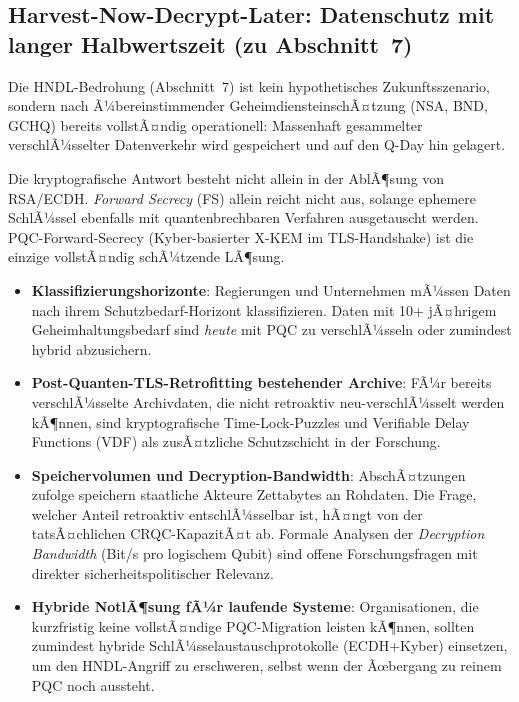 ﻿\documentclass[a4paper,12pt]{article}
\theoremstyle{definition}
\begin{document}
\subsection{Harvest-Now-Decrypt-Later: Datenschutz mit langer Halbwertszeit (zu Abschnitt~7)}

Die HNDL-Bedrohung (Abschnitt~7) ist kein hypothetisches
Zukunftsszenario, sondern nach Ã¼bereinstimmender
GeheimdiensteinschÃ¤tzung (NSA, BND, GCHQ) bereits vollstÃ¤ndig
operationell: Massenhaft gesammelter verschlÃ¼sselter Datenverkehr
wird gespeichert und auf den Q-Day hin gelagert.

Die kryptografische Antwort besteht nicht allein in der AblÃ¶sung
von RSA/ECDH. \emph{Forward Secrecy} (FS) allein reicht nicht aus,
solange ephemere SchlÃ¼ssel ebenfalls mit quantenbrechbaren Verfahren
ausgetauscht werden. PQC-Forward-Secrecy (Kyber-basierter X-KEM im
TLS-Handshake) ist die einzige vollstÃ¤ndig schÃ¼tzende LÃ¶sung.

\begin{itemize}
  \item \textbf{Klassifizierungshorizonte}: Regierungen und Unternehmen
    mÃ¼ssen Daten nach ihrem Schutzbedarf-Horizont klassifizieren.
    Daten mit 10+ jÃ¤hrigem Geheimhaltungsbedarf sind \emph{heute}
    mit PQC zu verschlÃ¼sseln oder zumindest hybrid abzusichern.
  \item \textbf{Post-Quanten-TLS-Retrofitting bestehender Archive}:
    FÃ¼r bereits verschlÃ¼sselte Archivdaten, die nicht retroaktiv
    neu-verschlÃ¼sselt werden kÃ¶nnen, sind kryptografische
    Time-Lock-Puzzles und Verifiable Delay Functions (VDF) als
    zusÃ¤tzliche Schutzschicht in der Forschung.
  \item \textbf{Speichervolumen und Decryption-Bandwidth}:
    AbschÃ¤tzungen zufolge speichern staatliche Akteure Zettabytes
    an Rohdaten. Die Frage, welcher Anteil retroaktiv entschlÃ¼sselbar
    ist, hÃ¤ngt von der tatsÃ¤chlichen CRQC-KapazitÃ¤t ab. Formale
    Analysen der \emph{Decryption Bandwidth} (Bit/s pro logischem Qubit)
    sind offene Forschungsfragen mit direkter sicherheitspolitischer
    Relevanz.
  \item \textbf{Hybride NotlÃ¶sung fÃ¼r laufende Systeme}:
    Organisationen, die kurzfristig keine vollstÃ¤ndige
    PQC-Migration leisten kÃ¶nnen, sollten zumindest
    hybride SchlÃ¼sselaustauschprotokolle (ECDH+Kyber) einsetzen,
    um den HNDL-Angriff zu erschweren, selbst wenn der
    Ãœbergang zu reinem PQC noch aussteht.
\end{itemize}
\end{document}
